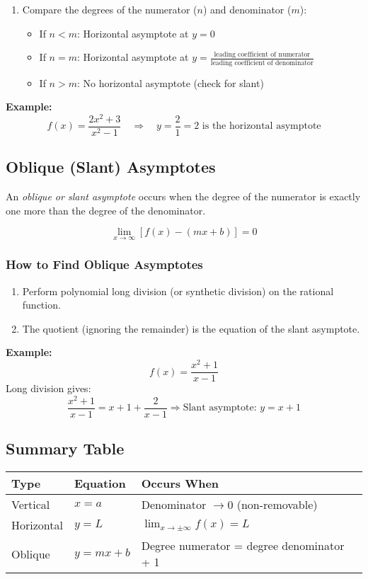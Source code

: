 \begin{enumerate}
    \item Compare the degrees of the numerator (\(n\)) and denominator (\(m\)):
    \begin{itemize}[label=\(-\)]
        \item If \(n < m\): Horizontal asymptote at \(y = 0\)
        \item If \(n = m\): Horizontal asymptote at \(y = \frac{\text{leading coefficient of numerator}}{\text{leading coefficient of denominator}}\)
        \item If \(n > m\): No horizontal asymptote (check for slant)
    \end{itemize}
\end{enumerate}

\textbf{Example:}
\[
f(x) = \frac{2x^2 + 3}{x^2 - 1} \quad \Rightarrow \quad y = \frac{2}{1} = 2 \text{ is the horizontal asymptote}
\]

\subsection{Oblique (Slant) Asymptotes}

An \emph{oblique or slant asymptote} occurs when the degree of the numerator is exactly one more than the degree of the denominator.

\[
\lim_{x \to \infty} [f(x) - (mx + b)] = 0
\]

\subsubsection{How to Find Oblique Asymptotes}

\begin{enumerate}
    \item Perform polynomial long division (or synthetic division) on the rational function.
    \item The quotient (ignoring the remainder) is the equation of the slant asymptote.
\end{enumerate}

\textbf{Example:}
\[
f(x) = \frac{x^2 + 1}{x - 1}
\]
Long division gives:
\[
\frac{x^2 + 1}{x - 1} = x + 1 + \frac{2}{x - 1}
\Rightarrow \text{Slant asymptote: } y = x + 1
\]

\subsection{Summary Table}

\begin{center}
\begin{tabular}{|l|l|l|}
\hline
\textbf{Type} & \textbf{Equation} & \textbf{Occurs When} \\
\hline
Vertical      & \(x = a\)           & Denominator \(\to 0\) (non-removable) \\
Horizontal    & \(y = L\)           & \(\lim_{x \to \pm \infty} f(x) = L\) \\
Oblique       & \(y = mx + b\)      & Degree numerator = degree denominator + 1 \\
\hline
\end{tabular}
\end{center}

\newpage